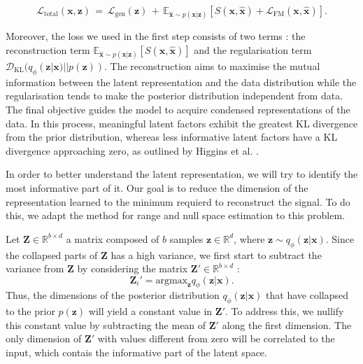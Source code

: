 \documentclass{article}
\begin{document}
\begin{equation}
    \mathcal{L}_{\text{total}} (\textbf{x},\textbf{z}) \,=\, \mathcal{L}_{\text{gen}}(\textbf{z})\,+\,\mathbb{E}_{\bm\hat{\textbf{x}} \sim p(\textbf{x}|\textbf{z})}[S(\textbf{x}, \bm\hat{\textbf{x}}) + \mathcal{L}_{\text{FM}}(\textbf{x}, \bm\hat{\textbf{x}})].
\end{equation}



Moreover, the loss we used in the first step consists of two terms : the  reconstruction term $\mathbb{E}_{\hat{\textbf{x}} \sim p(\textbf{x}|\textbf{z})}[S(\textbf{x},\bm\hat{ \textbf{x}})]$ and the regularisation term $\mathcal{D}_{\text{KL}}(q_\phi (\textbf{z}|\textbf{x})||p(\textbf{z}))$. The reconstruction aims to maximise the mutual information between the latent representation and the data distribution while the regularisation tends to make the posterior distribution independent from data. The final objective guides the model to acquire condensed representations of the data. In this process, meaningful latent factors exhibit the greatest KL divergence from the prior distribution, whereas less informative latent factors have a KL divergence approaching zero, as outlined by Higgins et al. \cite{higginsVVAELEARNINGBASIC2017}.

In order to better understand the latent representation, we will try to identify the most informative part of it. Our goal is to reduce the dimension of the representation learned to the minimum requierd to reconstruct the signal. To do this, we adapt the method for range and null space estimation to this problem.

Let $\textbf{Z} \in \mathbb{R}^{b \times d}$ a matrix composed of $b$ samples $\textbf{z} \in \mathbb{R}^d$, where $\textbf{z} \sim q_\phi(\textbf{z}|\textbf{x})$. Since the collapsed parts of \textbf{Z} has a high variance, we first start to subtract the variance from \textbf{Z} by considering the matrix $\textbf{Z}' \in \mathbb{R}^{b \times d}$ :
\begin{equation}
    \textbf{Z}_i' = \text{argmax}_{\textbf{z}} q_\phi (\textbf{z}|\textbf{x}).
\end{equation}
Thus, the dimensions of the posterior distribution \(q_{\phi}(\textbf{z}|\textbf{x})\) that have collapsed to the prior \(p(\textbf{z})\) will yield a constant value in \(\textbf{Z}'\). To address this, we nullify this constant value by subtracting the mean of \(\textbf{Z}'\) along the first dimension. The only dimension of $\textbf{Z}'$ with values different from zero will be correlated to the input, which contais the informative part of the latent space.
\end{document}
